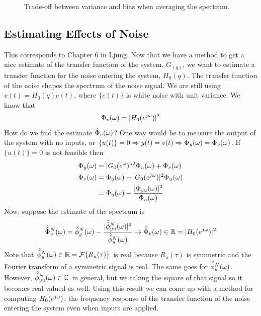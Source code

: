 \begin{figure}[ht!]
  \centering
   \hfill
   \hfill
  \caption{Trade-off between variance and bias when averaging the spectrum.}
  \label{fig:07tradeoff}
\end{figure}

\subsection{Estimating Effects of Noise}
This corresponds to Chapter 6 in Ljung. Now that we have a method to get a nice estimate of the transfer function of the system, $G_(q)$, we want to estimate a transfer function for the noise entering the system, $H_0(q)$. The transfer function of the noise shapes the spectrum of the noise signal. We are still using $v(t) = H_0(q)e(t)$, where $\{e(t)\}$ is white noise with unit variance. We know that
$$\Phi_v(\omega) = |H_0(e^{j\omega})|^2$$
How do we find the estimate $\hat{\Phi}_v(\omega)$? One way would be to measure the output of the system with no inputs, or $\{u(t)\}=0 \Rightarrow y(t) = v(t) \Rightarrow \Phi_y(\omega) = \Phi_v(\omega)$. If $\{u(t)\}=0$ is not feasible then
\begin{align*}
\Phi_y(\omega) &= |G_0(e^{\omega})``^2\Phi_u(\omega) + \Phi_v(\omega) \\
\Phi_v(\omega) &= \Phi_y(\omega) - |G_0(e^{j\omega})|^2\Phi_u(\omega) \\
&= \Phi_y(\omega) - \frac{|\Phi_{yu}(\omega)|^2}{\Phi_u(\omega)}
\end{align*}
Now, suppose the estimate of the spectrum is
\begin{align*}
\hat{\hat{\Phi}}_v^N(\omega) = \hat{\hat{\phi}}_y^N(\omega) - \frac{|\hat{\hat{\phi}}_{yu}^N(\omega)|^2}{\hat{\hat{\phi}}_u^N(\omega)} \to \hat{\hat{\Phi}}_v(\omega)\in\mathbb{R} = |H_0(e^{j\omega})|^2
\end{align*}
Note that $\hat{\hat{\phi}}_y^N(\omega)\in\mathbb{R} = \mathcal{F}\{R_u(\tau)\}$ is real because $R_u(\tau)$ is symmetric and the Fourier transform of a symmetric signal is real. The same goes for $\hat{\hat{\phi}}_u^N(\omega)$. However, $\hat{\hat{\phi}}_{yu}^N(\omega)\in\mathbb{C}$ in general, but we taking the square of that signal so it becomes real-valued as well. Using this result we can come up with a method for computing $H_0(e^{j\omega})$, the frequency response of the transfer function of the noise entering the system even when inputs are applied.

